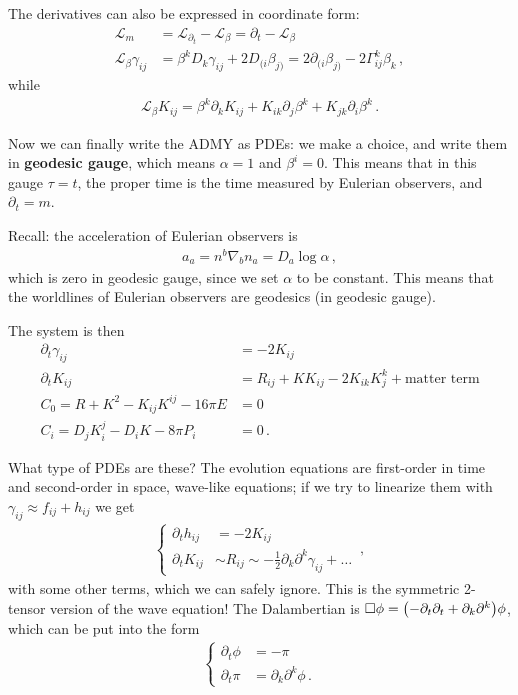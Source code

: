 \documentclass[main.tex]{subfiles}
\begin{document}
The derivatives can also be expressed in coordinate form: 
%
\begin{align}
\mathscr{L}_m &= \mathscr{L}_{\partial_{t}} - \mathscr{L}_{\beta } = \partial_{t} - \mathscr{L}_\beta   \\
\mathscr{L}_\beta  \gamma_{ij} &= \beta^{k} D_k \gamma_{ij} + 2 D_{(i} \beta_{j)}
= 2 \partial_{(i} \beta_{j)} - 2 \Gamma_{ij}^{k} \beta_{k} 
\,,
\end{align}
%
while 
%
\begin{align}
\mathscr{L}_\beta K_{ij} = \beta^{k} \partial_{k} K_{ij} + K_{ik} \partial_{j} \beta^{k} + K_{jk}\partial_{i}\beta^{k}
\,.
\end{align}

Now we can finally write the ADMY as PDEs: we make a choice, and write them in \textbf{geodesic gauge}, which means \(\alpha = 1\) and \(\beta^{i} = 0\). 
This means that in this gauge \(\tau = t\), the proper time is the time measured by Eulerian observers, and \(\partial_{t} = m\). 

Recall: the acceleration of Eulerian observers is 
%
\begin{align}
a_{a} = n^b \nabla_{b} n_a = D_a \log \alpha 
\,,
\end{align}
%
which is zero in geodesic gauge, since we set \(\alpha \) to be constant. 
This means that the worldlines of Eulerian observers are geodesics (in geodesic gauge). 

The system is then 
%
\begin{align}
\partial_{t} \gamma_{ij} &= - 2 K_{ij}  \\
\partial_{t} K_{ij} &= R_{ij} + K K_{ij} - 2 K_{ik} K^{k}_{j} + \text{matter term}  \\
C_0 = R + K^2 - K_{ij} K^{ij} - 16 \pi E &= 0  \\
C_{i} = D_j K^{j}_{i} - D_i K - 8 \pi P_i &= 0
\,.
\end{align}

What type of PDEs are these?
The evolution equations are first-order in time and second-order in space, wave-like equations;
if we try to linearize them with \(\gamma_{ij} \approx f_{ij} + h_{ij}\) we get 
%
\begin{align}
\begin{cases}
    \partial_{t} h_{ij} &= - 2 K_{ij}  \\
    \partial_{t} K_{ij} &\sim R_{ij} \sim - \frac{1}{2} \partial_{k} \partial^{k} \gamma_{ij} + \dots
\end{cases}
\,,
\end{align}
%
with some other terms, which we can safely ignore. 
This is the symmetric 2-tensor version of the wave equation! 
The Dalambertian is  \(\square \phi = \qty(- \partial_{t} \partial_{t}  + \partial_{k} \partial^{k}) \phi \), which can be put into the form 
%
\begin{align}
\begin{cases}
    \partial_{t} \phi &= - \pi   \\
    \partial_{t} \pi &= \partial_{k} \partial^{k} \phi 
\,.
\end{cases}
\end{align}
\end{document}
